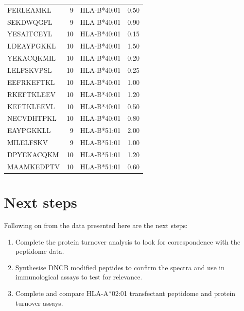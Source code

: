 \documentclass[12pt,]{book}
\providecommand{\tightlist}{%
  \setlength{\itemsep}{0pt}\setlength{\parskip}{0pt}}
\begin{document}
\begin{table}
\begin{tabular}[t]{lrlr}
FERLEAMKL & 9 & HLA-B*40:01 & 0.50\\
\addlinespace
SEKDWQGFL & 9 & HLA-B*40:01 & 0.90\\
YESAITCEYL & 10 & HLA-B*40:01 & 0.15\\
LDEAYPGKKL & 10 & HLA-B*40:01 & 1.50\\
YEKACQKMIL & 10 & HLA-B*40:01 & 0.20\\
LELFSKVPSL & 10 & HLA-B*40:01 & 0.25\\
\addlinespace
EEFRKEFTKL & 10 & HLA-B*40:01 & 1.00\\
RKEFTKLEEV & 10 & HLA-B*40:01 & 1.20\\
KEFTKLEEVL & 10 & HLA-B*40:01 & 0.50\\
NECVDHTPKL & 10 & HLA-B*40:01 & 0.80\\
EAYPGKKLL & 9 & HLA-B*51:01 & 2.00\\
\addlinespace
MILELFSKV & 9 & HLA-B*51:01 & 1.00\\
DPYEKACQKM & 10 & HLA-B*51:01 & 1.20\\
MAAMKEDPTV & 10 & HLA-B*51:01 & 0.60\\
\bottomrule
\end{tabular}
\end{table}

\chapter{Next steps}\label{next-steps}

Following on from the data presented here are the next steps:

\begin{enumerate}
\def\labelenumi{\arabic{enumi}.}
\tightlist
\item
  Complete the protein turnover analysis to look for correspondence with
  the peptidome data.
\item
  Synthesise DNCB modified peptides to confirm the spectra and use in
  immunological assays to test for relevance.
\item
  Complete and compare HLA-A*02:01 transfectant peptidome and protein
  turnover assays.
\end{enumerate}


\end{document}
